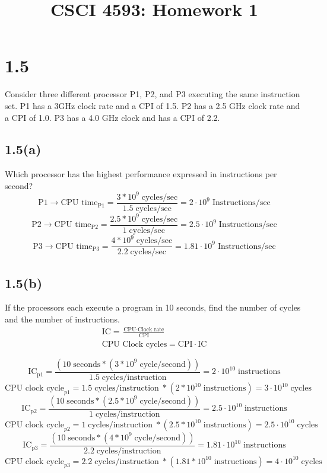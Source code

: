 \documentclass[12pt]{article}
\begin{document}
	
\title{CSCI 4593: Homework 1}
\author{}
\date{}

\maketitle

\section*{1.5}
Consider three different processor P1, P2, and P3 executing the same
instruction set.  P1 has a 3GHz clock rate and a CPI of 1.5.  P2 has
a 2.5 GHz clock rate and a CPI of 1.0.  P3 has a 4.0 GHz clock and has
a CPI of 2.2.

\subsection*{1.5(a)}
Which processor has the highest performance expressed in instructions per second?
\[
	\mathrm{P1}\rightarrow \text{CPU time}_\mathrm{P1}=\frac{3*10^9\;\text{cycles/sec}}{1.5\;\text{cycles/sec}} = 2\cdot10^9\;\text{Instructions/sec}
\]
\[
	\mathrm{P2}\rightarrow \text{CPU time}_\mathrm{P2}=\frac{2.5*10^9\;\text{cycles/sec}}{1\;\text{cycles/sec}} = 2.5\cdot10^9\;\text{Instructions/sec}
\]
\[
	\mathrm{P3}\rightarrow \text{CPU time}_\mathrm{P3}=\frac{4*10^9\;\text{cycles/sec}}{2.2\;\text{cycles/sec}} = 1.81\cdot10^9\;\text{Instructions/sec}
\]

\subsection*{1.5(b)}
If the processors each execute a program in 10 seconds, find the number of cycles and the number of instructions.
\begin{gather*}
	\text{IC} = \frac{\text{CPU}\cdot{\text{Clock rate}}}{\text{CPI}}\\
	\text{CPU Clock cycles} = \text{CPI}\cdot{\text{IC}}
\end{gather*}

\[ \text{IC}_{\text{p1}} = \frac{(10\;\text{seconds}*(3*10^9\;\text{cycle/second}))}{1.5\;\text{cycles/instruction}} = 2\cdot{10^{10}}\;\text{instructions}
\]
\[
\text{CPU clock cycle}_{p1} = 1.5\;\text{cycles/instruction}\;*(2*10^{10}\;\text{instructions}) = 3\cdot{10^{10}}\;\text{cycles}
\]
\[ \text{IC}_{\text{p2}} = \frac{(10\;\text{seconds}*(2.5*10^9\;\text{cycle/second}))}{1\;\text{cycles/instruction}} = 2.5\cdot{10^{10}}\;\text{instructions}
\]
\[
\text{CPU clock cycle}_{p2} = 1\;\text{cycles/instruction}\;*(2.5*10^{10}\;\text{instructions}) = 2.5\cdot{10^{10}}\;\text{cycles}
\]
\[ \text{IC}_{\text{p3}} = \frac{(10\;\text{seconds}*(4*10^9\;\text{cycle/second}))}{2.2\;\text{cycles/instruction}} = 1.81\cdot{10^{10}}\;\text{instructions}
\]
\[
\text{CPU clock cycle}_{p3} = 2.2\;\text{cycles/instruction}\;*(1.81*10^{10}\;\text{instructions}) = 4\cdot{10^{10}}\;\text{cycles}
\]
\end{document}

